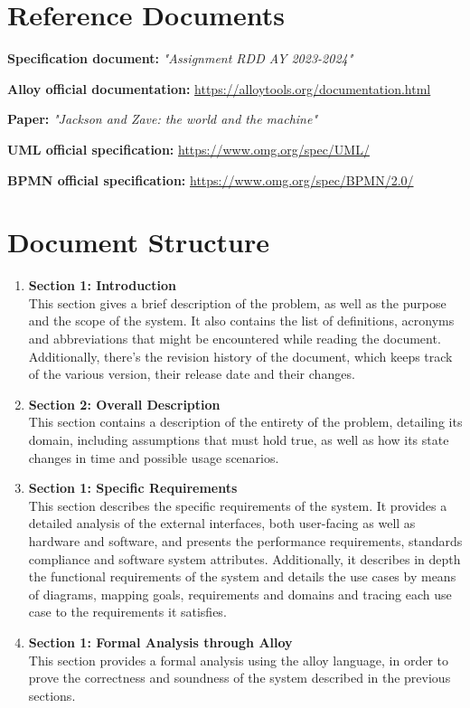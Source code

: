 \section{Reference Documents}

\begin{description}[labelwidth=4em, style=nextline]
    \item \textbf{Specification document:} \emph{"Assignment RDD AY 2023-2024"}
    \item \textbf{Alloy official documentation:} \url{https://alloytools.org/documentation.html}
    \item \textbf{Paper:} \emph{"Jackson and Zave: the world and the machine"}
    \item \textbf{UML official specification:} \url{https://www.omg.org/spec/UML/}
    \item \textbf{BPMN official specification:} \url{https://www.omg.org/spec/BPMN/2.0/}
\end{description}


\section{Document Structure}

\begin{enumerate}
    \item \textbf{Section 1: Introduction} \\
          This section gives a brief description of the problem, as well as the purpose and the scope of
          the system.
          It also contains the list of definitions, acronyms and abbreviations that might be encountered
          while reading the document.
          Additionally, there's the revision history of the document, which keeps track of the various
          version, their release date and their changes.
    \item \textbf{Section 2: Overall Description} \\
          This section contains a description of the entirety of the problem, detailing its domain,
          including assumptions that must hold true, as well as how its state changes in time
          and possible usage scenarios.
    \item \textbf{Section 1: Specific Requirements} \\
          This section describes the specific requirements of the system. It provides a detailed analysis
          of the external interfaces, both user-facing as well as hardware and software, and presents the
          performance requirements, standards compliance and software system attributes.
          Additionally, it describes in depth the functional requirements of the system and details the
          use cases by means of diagrams, mapping goals, requirements and domains and tracing each use
          case to the requirements it satisfies.
    \item \textbf{Section 1: Formal Analysis through Alloy} \\
          This section provides a formal analysis using the alloy language, in order
          to prove the correctness and soundness of the system described in the previous sections.
\end{enumerate}